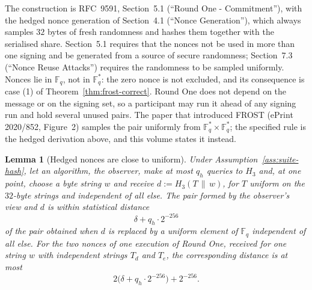 \documentclass[11pt,a4paper]{article}
\newtheorem{lemma}[theorem]{Lemma}
\theoremstyle{definition}
\newcommand{\F}{\mathbb{F}}
\newcommand{\Fq}{\F_q}
\begin{document}
The construction is RFC~9591, Section~5.1 (``Round One - Commitment''),
with the hedged nonce generation of Section~4.1 (``Nonce Generation''),
which always samples \(32\) bytes of fresh randomness and hashes them
together with the serialised share. Section~5.1 requires that the nonces
not be used in more than one signing and be generated from a source of
secure randomness; Section~7.3 (``Nonce Reuse Attacks'') requires the
randomness to be sampled uniformly. Nonces lie in \(\Fq\), not in
\(\Fq^{*}\): the zero nonce is not excluded, and its consequence is case
(1) of Theorem~\ref{thm:frost-correct}. Round One does not depend on the
message or on the signing set, so a participant may run it ahead of any
signing run and hold several unused pairs. The paper that introduced FROST
(ePrint 2020/852, Figure~2) samples the pair uniformly from
\(\Fq^{*} \times \Fq^{*}\); the specified rule is the hedged derivation
above, and this volume states it instead.

\begin{lemma}[Hedged nonces are close to uniform]\label{lem:nonce-uniform}
Under Assumption~\ref{ass:suite-hash}, let an algorithm, the observer, make
at most \(q_h\) queries to \(H_3\) and, at one point, choose a byte string
\(w\) and receive \(d := H_3(T \,\|\, w)\), for \(T\) uniform on the
\(32\)-byte strings and independent of all else. The pair formed by the
observer's view and \(d\) is within statistical distance
\[
  \delta + q_h \cdot 2^{-256}
\]
of the pair obtained when \(d\) is replaced by a uniform element of \(\Fq\)
independent of all else. For the two nonces of one execution of Round One,
received for one string \(w\) with independent strings \(T_d\) and
\(T_e\), the corresponding distance is at most
\[
  2\bigl(\delta + q_h \cdot 2^{-256}\bigr) + 2^{-256} .
\]
\end{lemma}
\end{document}
